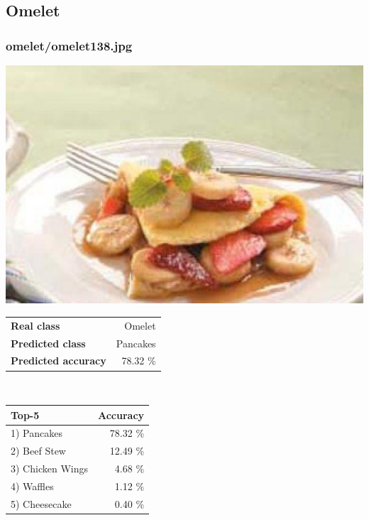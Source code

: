\subsection{Omelet}
    
\subsubsection{omelet/omelet138.jpg}

\begin{minipage}[t]{0.4\textwidth}
	\vspace{0pt}
	\includegraphics[width=\linewidth]{images/evaluation-images/omelet/omelet138.jpg}
\end{minipage}
\hfill
\begin{minipage}[t]{0.5\textwidth}
	\vspace{0pt}\raggedright
	\begin{tabularx}{\textwidth}{X r}
		\small \textbf{Real class} & \small Omelet\\
		\small \textbf{Predicted class} & \small Pancakes\\
		\small \textbf{Predicted accuracy} & \small 78.32 \%
    \end{tabularx}\\
    
    \vspace{6pt}
	\begin{tabularx}{\textwidth}{X r}
        \small \textbf{Top-5} & \small \textbf{Accuracy} \\
        \hline
		\small 1) Pancakes & \small 78.32 \%\\\small 2) Beef Stew & \small 12.49 \%\\\small 3) Chicken Wings & \small 4.68 \%\\\small 4) Waffles & \small 1.12 \%\\\small 5) Cheesecake & \small 0.40 \%
    \end{tabularx}
\end{minipage}
    
